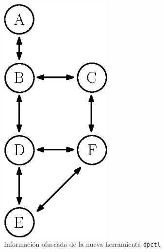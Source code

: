 \begin{figure}[ht]
    \centering
    \includegraphics[width=0.5\textwidth]{archivos/img/dev/topo_eva.eps}
    \caption{Información ofuscada de la nueva herramienta \texttt{dpctl}}
    \label{fig:topo_eva}
\end{figure}


